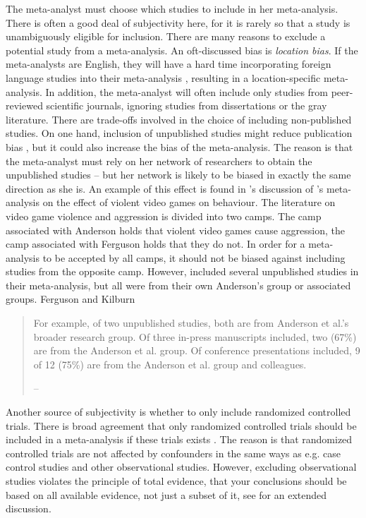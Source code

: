 The meta-analyst must choose which studies to include in her meta-analysis.
There is often a good deal of subjectivity here, for it is rarely
so that a study is unambiguously eligible for inclusion. There are
many reasons to exclude a potential study from a meta-analysis. An
oft-discussed bias is \emph{location bias}. If the meta-analysts
are English, they will have a hard time incorporating foreign language
studies into their meta-analysis \parencite{Egger1998-kj}, resulting
in a location-specific meta-analysis. In addition, the meta-analyst
will often include only studies from peer-reviewed scientific journals,
ignoring studies from dissertations or the gray literature. There
are trade-offs involved in the choice of including non-published studies.
On one hand, inclusion of unpublished studies might reduce publication
bias \parencite{Egger1997-ue},
but it could also increase the bias of the meta-analysis. The reason
is that the meta-analyst must rely on her network of researchers to
obtain the unpublished studies -- but her network is likely to be
biased in exactly the same direction as she is. An example of this
effect is found in \cite{ferguson_much_2010}'s discussion of \cite{anderson_violent_2010}'s
meta-analysis on the effect of violent video games on behaviour. The
literature on video game violence and aggression is divided into two
camps. The camp associated with Anderson holds that violent video
games cause aggression, the camp associated with Ferguson holds that
they do not. In order for a meta-analysis to be accepted by all camps,
it should not be biased against including studies from the opposite
camp. However, \cite{anderson_violent_2010} included several unpublished
studies in their meta-analysis, but all were from their own Anderson's
group or associated groups. Ferguson and Kilburn 
\begin{quote}
For example, of two unpublished studies, both are from Anderson et
al.\textquoteright s broader research group. Of three in-press manuscripts
included, two (67\%) are from the Anderson et al. group. Of conference
presentations included, 9 of 12 (75\%) are from the Anderson et al.
group and colleagues. 
\begin{flushright}
-- \cite[p. 2]{ferguson_much_2010}
\par\end{flushright}

\end{quote}
Another source of subjectivity is whether to only include randomized
controlled trials. There is broad agreement that only randomized controlled
trials should be included in a meta-analysis if these trials exists
\parencite{Egger1997-ue}. The reason is that randomized
controlled trials are not affected by confounders in the same ways
as e.g. case control studies and other observational studies. However,
excluding observational studies violates the principle of total evidence,
that your conclusions should be based on all available evidence, not
just a subset of it, see \cite{Stegenga2011-zo} for an extended
discussion.

